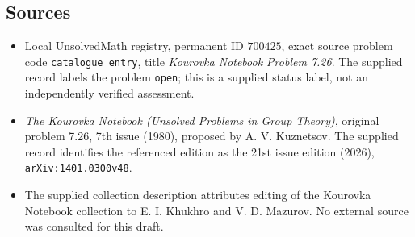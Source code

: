 \documentclass[11pt]{article}
\begin{document}
\subsection{Sources}
\begin{itemize}
\item Local UnsolvedMath registry, permanent ID \(700425\), exact source problem code \texttt{catalogue entry}, title \emph{Kourovka Notebook Problem 7.26}. The supplied record labels the problem \texttt{open}; this is a supplied status label, not an independently verified assessment.
\item \emph{The Kourovka Notebook (Unsolved Problems in Group Theory)}, original problem 7.26, 7th issue (1980), proposed by A. V. Kuznetsov. The supplied record identifies the referenced edition as the 21st issue edition (2026), \texttt{arXiv:1401.0300v48}.
\item The supplied collection description attributes editing of the Kourovka Notebook collection to E. I. Khukhro and V. D. Mazurov. No external source was consulted for this draft.
\end{itemize}
\end{document}
